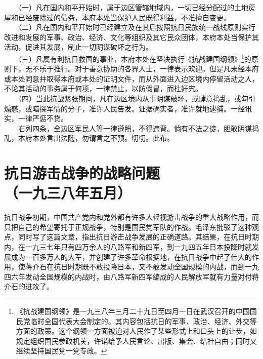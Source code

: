 \documentclass[cn,11pt,chinese]{elegantbook}
\def\myformat#1{\hfil\hfil #1}
\begin{document}
　　（一）凡在国内和平开始时，属于边区管辖地域内，一切已经分配过的土地房屋和已经废除过的债务，本府本处当保护人民既得利益，不准擅自变更。\\
　　（二）凡在国内和平开始时已经建立及在其后按照抗日民族统一战线原则实行改进和发展的军事、政治、经济、文化等组织及其它民众团体，本府本处当保护其活动，促进其发展，制止一切阴谋破坏之行为。\\
　　（三）凡属有利抗日救国的事业，本府本处在坚决执行《抗战建国纲领》\footnote[3]{ 《抗战建国纲领》是一九三八年三月二十九日至四月一日在武汉召开的中国国民党临时全国代表大会制定的。其内容包括抗日的军事、政治、经济、外交等方面的政策。这个纲领一方面被迫对人民作了某些形式上和口头上的让步，如规定组织国民参政机关，许诺给予人民言论、出版、集会、结社自由；同时又继续坚持国民党一党专政。}的原则下，无不乐于推行。对于善意协助的各界人士，一律表示欢迎。但是凡未经本府或本处同意并取得本府或本处的证明文件，而从外面进入边区境内停留活动之人，不论其活动的事务属于何项，一律禁止，以防假冒，而杜奸宄。\\
　　（四）当此抗战紧张期间，凡在边区境内从事阴谋破坏，或肆意捣乱，或勾引煽惑，或暗探军情的分子，准许人民告发。证据确实者，准许就地逮捕。一经讯实，一律严惩不贷。\\
　　右列四条，全边区军民人等一律遵照，不得违背。倘有不法之徒，胆敢阴谋捣乱，本府本处言出法随，勿谓言之不预。切切。此布。\\
\newpage\section*{\myformat{抗日游击战争的战略问题}\\\myformat{（一九三八年五月）}}
\begin{introduction}\item  抗日战争初期，中国共产党内和党外都有许多人轻视游击战争的重大战略作用，而只把自己的希望寄托于正规战争，特别是国民党军队的作战。毛泽东批驳了这种观点，同时写了这篇文章，指出抗日游击战争发展的正确道路。其结果，在抗日时期内，在一九三七年只有四万余人的八路军和新四军，到一九四五年日本投降时就发展成为一百多万人的大军，并创建了许多革命根据地，在抗日战争中起了伟大的作用，使蒋介石在抗日时期既不敢投降日本，又不敢发动全国规模的内战，而到一九四六年发动全国规模的内战时，由八路军新四军编成的人民解放军就有力量对付蒋介石的进攻了。\end{introduction}
\end{document}

